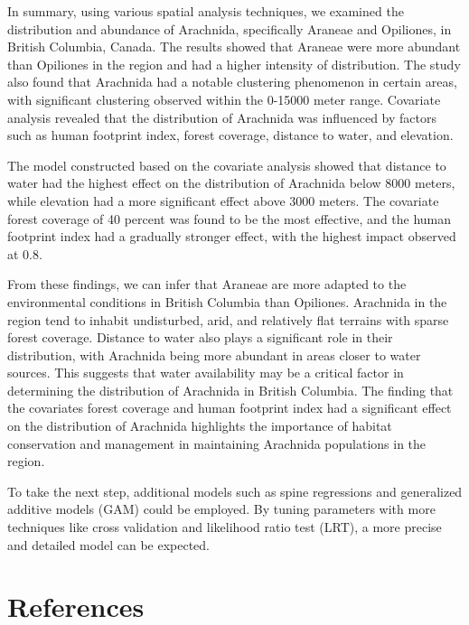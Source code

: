 \documentclass{article}
\begin{document}
In summary, using various spatial analysis techniques, we examined the
distribution and abundance of Arachnida, specifically Araneae and
Opiliones, in British Columbia, Canada. The results showed that Araneae
were more abundant than Opiliones in the region and had a higher
intensity of distribution. The study also found that Arachnida had a
notable clustering phenomenon in certain areas, with significant
clustering observed within the 0-15000 meter range. Covariate analysis
revealed that the distribution of Arachnida was influenced by factors
such as human footprint index, forest coverage, distance to water, and
elevation.

The model constructed based on the covariate analysis showed that
distance to water had the highest effect on the distribution of
Arachnida below 8000 meters, while elevation had a more significant
effect above 3000 meters. The covariate forest coverage of 40 percent
was found to be the most effective, and the human footprint index had a
gradually stronger effect, with the highest impact observed at 0.8.

From these findings, we can infer that Araneae are more adapted to the
environmental conditions in British Columbia than Opiliones. Arachnida
in the region tend to inhabit undisturbed, arid, and relatively flat
terrains with sparse forest coverage. Distance to water also plays a
significant role in their distribution, with Arachnida being more
abundant in areas closer to water sources. This suggests that water
availability may be a critical factor in determining the distribution of
Arachnida in British Columbia. The finding that the covariates forest
coverage and human footprint index had a significant effect on the
distribution of Arachnida highlights the importance of habitat
conservation and management in maintaining Arachnida populations in the
region.

To take the next step, additional models such as spine regressions and
generalized additive models (GAM) could be employed. By tuning
parameters with more techniques like cross validation and likelihood
ratio test (LRT), a more precise and detailed model can be expected.

\hypertarget{references}{%
\section*{References}\label{references}}
\end{document}
